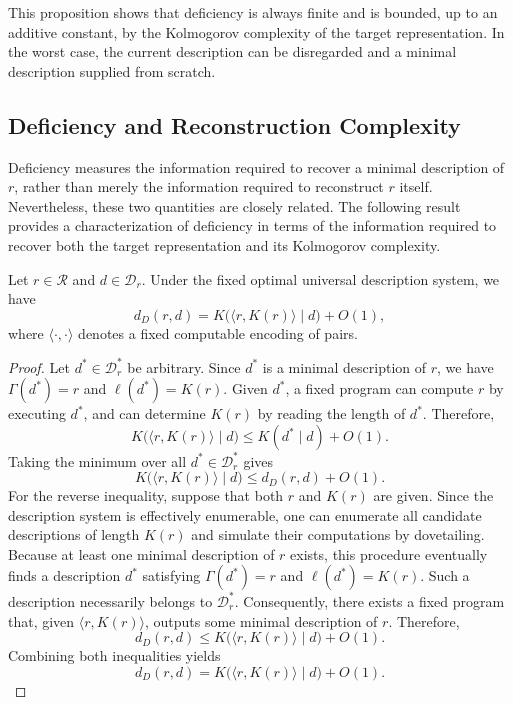 This proposition shows that deficiency is always finite and is bounded, up to an additive constant, by the Kolmogorov complexity of the target representation. In the worst case, the current description can be disregarded and a minimal description supplied from scratch.


\subsection*{Deficiency and Reconstruction Complexity}

Deficiency measures the information required to recover a minimal description of $r$, rather than merely the information required to reconstruct $r$ itself. Nevertheless, these two quantities are closely related. The following result provides a characterization of deficiency in terms of the information required to recover both the target representation and its Kolmogorov complexity.

\begin{proposition}
\label{prop:deficiency_description_characterization}
Let $r\in\mathcal R$ and $d\in\mathcal D_r$. Under the fixed optimal universal description system, we have
\[
d_D(r,d) = K\bigl(\langle r,K(r)\rangle\mid d\bigr)+O(1),
\]
where $\langle\cdot,\cdot\rangle$ denotes a fixed computable encoding of pairs.
\end{proposition}
\begin{proof}
Let $d^\ast\in\mathcal D_r^\ast$ be arbitrary. Since $d^\ast$ is a minimal description of $r$, we have $\Gamma(d^\ast)=r$ and $\ell(d^\ast)=K(r)$. Given $d^\ast$, a fixed program can compute $r$ by executing $d^\ast$, and can determine $K(r)$ by reading the length of $d^\ast$. Therefore,
\[
K\bigl(\langle r,K(r)\rangle\mid d\bigr) \le K(d^\ast\mid d)+O(1).
\]
Taking the minimum over all $d^\ast\in\mathcal D_r^\ast$ gives
\[
K\bigl(\langle r,K(r)\rangle\mid d\bigr)
\le d_D(r,d)+O(1).
\]
For the reverse inequality, suppose that both $r$ and $K(r)$ are given. Since the description system is effectively enumerable, one can enumerate all candidate descriptions of length $K(r)$ and simulate their computations by dovetailing. Because at least one minimal description of $r$ exists, this procedure eventually finds a description $d^\ast$ satisfying $\Gamma(d^\ast)=r$ and $\ell(d^\ast)=K(r)$. Such a description necessarily belongs to $\mathcal D_r^\ast$. Consequently, there exists a fixed program that, given $\langle r,K(r)\rangle$, outputs some minimal description of $r$. Therefore,
\[
d_D(r,d) \le K\bigl(\langle r,K(r)\rangle\mid d\bigr)+O(1).
\]
Combining both inequalities yields
\[
d_D(r,d) = K\bigl(\langle r,K(r)\rangle\mid d\bigr)+O(1).
\]
\end{proof}

